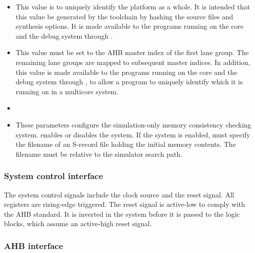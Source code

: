 \begin{itemize}
\item {}

This value is to uniquely identify the platform as a whole. It is intended that
this value be generated by the toolchain by hashing the source files and
synthesis options.  It is made available to the
programs running on the core and the debug system through .

\item {}

This value must be set to the AHB master index of the first lane group. The 
remaining lane groups are mapped to subsequent master indices. In addition, this 
value is made available to the programs running on the core and the debug system 
through , to allow a program to uniquely identify which \rvex{} it is 
running on in a multicore system.

\item {}
\item {}

These parameters configure the simulation-only memory consistency checking
system.  enables or disables the system. If the system is
enabled,  must specify the filename of an S-record file
holding the initial memory contents. The filename must be relative to the
simulator search path.

\end{itemize}

\subsubsection{System control interface}
\label{sec:rvsysgr-iface-sysctrl}

The system control signals include the clock source and the reset signal. All
registers are rising-edge triggered. The reset signal is active-low to comply
with the AHB standard. It is inverted in the system before it is passed to the
\rvex{} logic blocks, which assume an active-high reset signal.

\subsubsection{AHB interface}
\label{sec:rvsysgr-iface-ahb}

